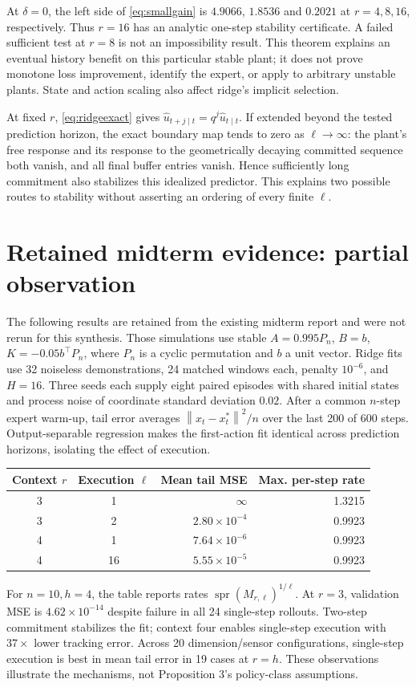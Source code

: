 \documentclass[11pt]{article}
\newcommand{\norm}[1]{\left\lVert#1\right\rVert}
\newcommand{\spr}{\operatorname{spr}}
\begin{document}
At $\delta=0$, the left side of \eqref{eq:smallgain} is $4.9066$, $1.8536$ and $0.2021$ at $r=4,8,16$, respectively. Thus $r=16$ has an analytic one-step stability certificate. A failed sufficient test at $r=8$ is not an impossibility result. This theorem explains an eventual history benefit on this particular stable plant; it does not prove monotone loss improvement, identify the expert, or apply to arbitrary unstable plants. State and action scaling also affect ridge's implicit selection.

At fixed $r$, \eqref{eq:ridgeexact} gives $\hat u_{t+j\mid t}=q^j\hat u_{t\mid t}$. If extended beyond the tested prediction horizon, the exact boundary map tends to zero as $\ell\to\infty$: the plant's free response and its response to the geometrically decaying committed sequence both vanish, and all final buffer entries vanish. Hence sufficiently long commitment also stabilizes this idealized predictor. This explains two possible routes to stability without asserting an ordering of every finite $\ell$.

\section{Retained midterm evidence: partial observation}
The following results are retained from the existing midterm report and were not rerun for this synthesis. Those simulations use stable $A=0.995P_n$, $B=b$, $K=-0.05b^\top P_n$, where $P_n$ is a cyclic permutation and $b$ a unit vector. Ridge fits use 32 noiseless demonstrations, 24 matched windows each, penalty $10^{-6}$, and $H=16$. Three seeds each supply eight paired episodes with shared initial states and process noise of coordinate standard deviation $0.02$. After a common $n$-step expert warm-up, tail error averages $\norm{x_t-x_t^*}^2/n$ over the last 200 of 600 steps. Output-separable regression makes the first-action fit identical across prediction horizons, isolating the effect of execution.

\begin{center}\small
\begin{tabular}{ccrr}\toprule
Context $r$ & Execution $\ell$ & Mean tail MSE & Max. per-step rate\\\midrule
3&1&$\infty$&1.3215\\
3&2&$2.80\times10^{-4}$&0.9923\\
4&1&$7.64\times10^{-6}$&0.9923\\
4&16&$5.55\times10^{-5}$&0.9923\\\bottomrule
\end{tabular}
\end{center}
For $n=10,h=4$, the table reports rates $\spr(M_{r,\ell})^{1/\ell}$. At $r=3$, validation MSE is $4.62\times10^{-14}$ despite failure in all 24 single-step rollouts. Two-step commitment stabilizes the fit; context four enables single-step execution with $37\times$ lower tracking error. Across 20 dimension/sensor configurations, single-step execution is best in mean tail error in 19 cases at $r=h$. These observations illustrate the mechanisms, not Proposition 3's policy-class assumptions.
\end{document}
